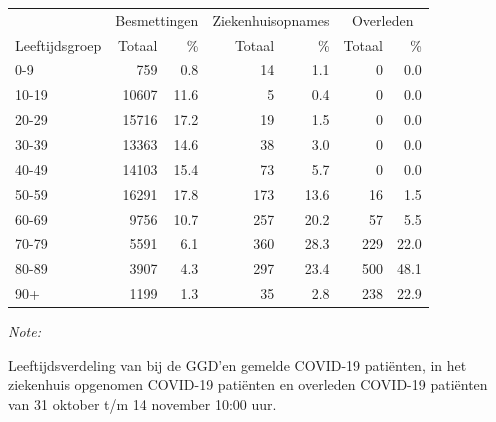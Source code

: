 \documentclass[
  english,
  man,floatsintext]{apa6}
\begin{document}
\begin{table}[H]
\centering\begingroup\fontsize{11}{13}\selectfont

\begin{threeparttable}
\begin{tabular}{lrrrrrr}
\toprule
\multicolumn{1}{c}{ } & \multicolumn{2}{c}{Besmettingen} & \multicolumn{2}{c}{Ziekenhuisopnames} & \multicolumn{2}{c}{Overleden} \\
\cmidrule(l{3pt}r{3pt}){2-3} \cmidrule(l{3pt}r{3pt}){4-5} \cmidrule(l{3pt}r{3pt}){6-7}
Leeftijdsgroep & Totaal & \% & Totaal & \% & Totaal & \%\\
\midrule
0-9 & 759 & 0.8 & 14 & 1.1 & 0 & 0.0\\
10-19 & 10607 & 11.6 & 5 & 0.4 & 0 & 0.0\\
20-29 & 15716 & 17.2 & 19 & 1.5 & 0 & 0.0\\
30-39 & 13363 & 14.6 & 38 & 3.0 & 0 & 0.0\\
40-49 & 14103 & 15.4 & 73 & 5.7 & 0 & 0.0\\
50-59 & 16291 & 17.8 & 173 & 13.6 & 16 & 1.5\\
60-69 & 9756 & 10.7 & 257 & 20.2 & 57 & 5.5\\
70-79 & 5591 & 6.1 & 360 & 28.3 & 229 & 22.0\\
80-89 & 3907 & 4.3 & 297 & 23.4 & 500 & 48.1\\
90+ & 1199 & 1.3 & 35 & 2.8 & 238 & 22.9\\
\bottomrule
\end{tabular}
\begin{tablenotes}
\item \textit{Note: } 
\item Leeftijdsverdeling van bij de GGD’en gemelde COVID-19 patiënten, in het ziekenhuis opgenomen COVID-19 patiënten en overleden COVID-19 patiënten van 31 oktober t/m 14 november 10:00 uur.
\end{tablenotes}
\end{threeparttable}
\endgroup{}
\end{table}
\end{document}

